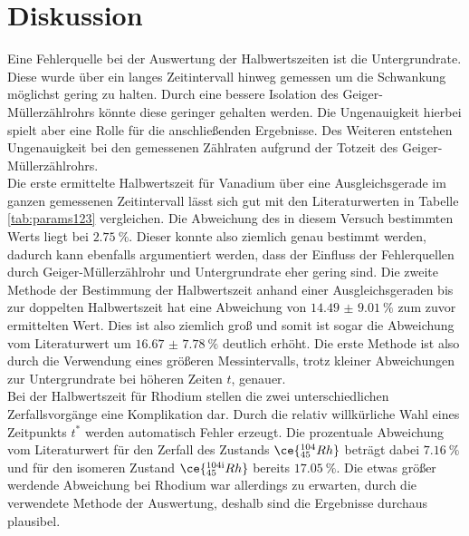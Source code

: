 \section{Diskussion}

Eine Fehlerquelle bei der Auswertung der Halbwertszeiten ist die Untergrundrate. Diese wurde über ein langes Zeitintervall hinweg gemessen um die
Schwankung möglichst gering zu halten. Durch eine bessere Isolation des Geiger-Müllerzählrohrs könnte diese geringer gehalten werden.
Die Ungenauigkeit hierbei spielt aber eine Rolle für die anschließenden Ergebnisse. Des Weiteren entstehen Ungenauigkeit bei
den gemessenen Zählraten aufgrund der Totzeit des Geiger-Müllerzählrohrs. 
\\
\newline
Die erste ermittelte Halbwertszeit für Vanadium über eine Ausgleichsgerade im ganzen gemessenen Zeitintervall lässt sich gut mit den Literaturwerten in Tabelle \ref{tab:params123} vergleichen. Die Abweichung des in diesem Versuch bestimmten Werts 
liegt bei $\SI{2.75}{\percent}$. Dieser konnte also ziemlich genau bestimmt werden, dadurch kann ebenfalls argumentiert werden, dass der Einfluss der Fehlerquellen
durch Geiger-Müllerzählrohr und Untergrundrate eher gering sind. Die zweite Methode der Bestimmung der Halbwertszeit anhand einer Ausgleichsgeraden
bis zur doppelten Halbwertszeit hat eine Abweichung von $\SI{14.49(901)}{\percent}$ zum zuvor ermittelten Wert. Dies ist also ziemlich groß und somit ist sogar
die Abweichung vom Literaturwert um $\SI{16.67(778)}{\percent}$ deutlich erhöht. Die erste Methode ist also durch die Verwendung eines größeren Messintervalls, trotz kleiner
Abweichungen zur Untergrundrate bei höheren Zeiten $t$, genauer.
\\
\newline
Bei der Halbwertszeit für Rhodium stellen die zwei unterschiedlichen Zerfallsvorgänge eine Komplikation dar. Durch die relativ willkürliche Wahl eines Zeitpunkts $t^{*}$ werden
automatisch Fehler erzeugt. Die prozentuale Abweichung vom Literaturwert für den Zerfall des Zustands $\ce{^{104}_{45}Rh}$ beträgt dabei $\SI{7.16}{\percent}$ und für den 
isomeren Zustand $\ce{^{104{\text{i}}}_{45}Rh}$ bereits $\SI{17.05}{\percent}$. 
Die etwas größer werdende Abweichung bei Rhodium war allerdings zu erwarten, durch die verwendete Methode der Auswertung, deshalb sind die Ergebnisse durchaus plausibel.
